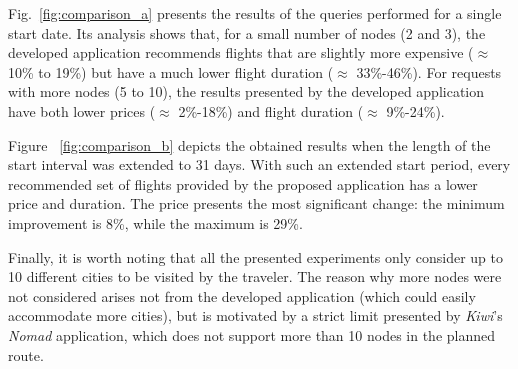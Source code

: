 Fig.~\ref{fig:comparison_a} presents the results of the queries performed for a single start date. Its analysis shows that, for a small number of nodes (2 and 3), the developed application recommends flights that are slightly more expensive ($\approx$ 10\% to 19\%) but have a much lower flight duration ($\approx$ 33\%-46\%). For requests with more nodes (5 to 10), the results presented by the developed application have both lower prices ($\approx$ 2\%-18\%) and flight duration ($\approx$ 9\%-24\%).

Figure ~\ref{fig:comparison_b}  depicts the obtained results when the length of the start interval was extended to 31 days. With such an extended start period, every recommended set of flights provided by the proposed application has a lower price and duration. The price presents the most significant change: the minimum improvement is 8\%, while the maximum is 29\%.

Finally, it is worth noting that all the presented experiments only consider up to 10 different cities to be visited by the traveler. The reason why more nodes were not considered arises not from the developed application (which could easily accommodate more cities), but is motivated by a strict limit presented by \textit{Kiwi}'s \textit{Nomad} application, which does not support more than 10 nodes in the planned route.
  



